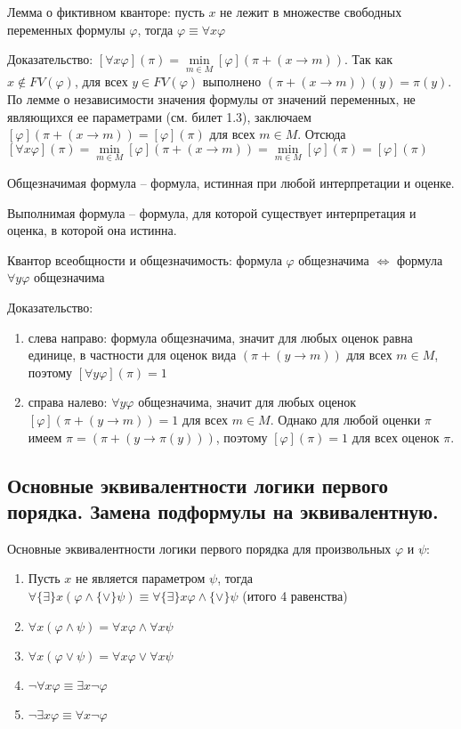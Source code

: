\documentclass[a4paper, 10pt]{article}
\begin{document}
\hfill

Лемма о фиктивном кванторе: пусть $x$ не лежит в множестве свободных переменных формулы $\varphi$, тогда $\varphi\equiv\forall x\varphi$

Доказательство: $[\forall x\varphi](\pi)=\min\limits_{m \in M}[\varphi](\pi+(x\to m))$. Так как $x\not\in FV(\varphi)$, для всех $y\in FV(\varphi)$ выполнено $(\pi+(x\to m))(y)=\pi(y)$. По лемме о независимости значения формулы от значений переменных, не являющихся ее параметрами (см. билет 1.3), заключаем $[\varphi](\pi+(x\to m))=[\varphi](\pi)$ для всех $m \in M$. Отсюда $[\forall x\varphi](\pi)=\min\limits_{m\in M} [\varphi](\pi + (x\to m)) = \min\limits_{m\in M} [\varphi](\pi) = [\varphi](\pi)$

\hfill

Общезначимая формула -- формула, истинная при любой интерпретации и оценке.

Выполнимая формула -- формула, для которой существует интерпретация и оценка, в которой она истинна.

\hfill

Квантор всеобщности и общезначимость: формула $\varphi$ общезначима $\iff$ формула $\forall y\varphi$ общезначима

Доказательство:
\begin{enumerate}
    \item слева направо: формула общезначима, значит для любых оценок равна единице, в частности для оценок вида $(\pi + (y\to m))$ для всех $m \in M$, поэтому $[\forall y\varphi](\pi)=1$
    \item справа налево: $\forall y\varphi$ общезначима, значит для любых оценок $[\varphi](\pi + (y\to m))=1$ для всех $m\in M$. Однако для любой оценки $\pi$ имеем $\pi=(\pi+(y\to\pi(y)))$, поэтому $[\varphi](\pi)=1$ для всех оценок $\pi$.
\end{enumerate}

\subsection{Основные эквивалентности логики первого порядка. Замена подформулы на эквивалентную.}

Основные эквивалентности логики первого порядка для произвольных $\varphi$ и $\psi$:

\begin{enumerate}
    \item Пусть $x$ не является параметром $\psi$, тогда $\forall\{\exists\} x (\varphi \land\{\lor\} \psi) \equiv \forall\{\exists\}x\varphi\land\{\lor\}\psi$ (итого 4 равенства)
    \item $\forall x (\varphi\land\psi) = \forall x\varphi \land \forall x\psi$
    \item $\forall x (\varphi\lor\psi) = \forall x\varphi \lor \forall x\psi$
    \item $\lnot\forall x\varphi \equiv \exists x \lnot \varphi$
    \item $\lnot\exists x\varphi \equiv \forall x \lnot \varphi$
\end{enumerate}
\end{document}
